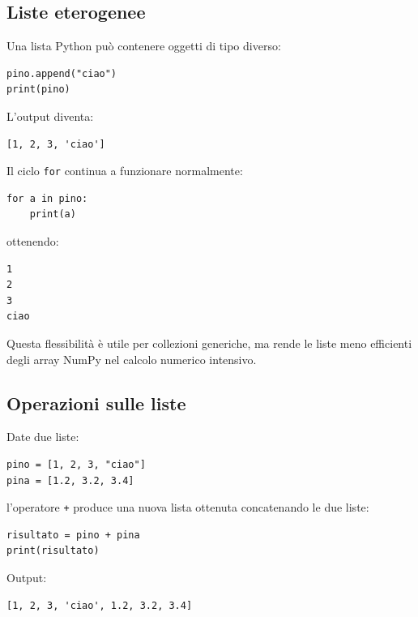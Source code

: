 \documentclass[11pt,a4paper]{book}
\begin{document}
\subsection{Liste eterogenee}

Una lista Python può contenere oggetti di tipo diverso:

\begin{lstlisting}[style=python]
pino.append("ciao")
print(pino)
\end{lstlisting}

L'output diventa:

\begin{lstlisting}[style=python, numbers=none]
[1, 2, 3, 'ciao']
\end{lstlisting}

Il ciclo \texttt{for} continua a funzionare normalmente:

\begin{lstlisting}[style=python]
for a in pino:
    print(a)
\end{lstlisting}

ottenendo:

\begin{lstlisting}[style=python, numbers=none]
1
2
3
ciao
\end{lstlisting}

Questa flessibilità è utile per collezioni generiche, ma rende le liste meno efficienti degli array NumPy nel calcolo numerico intensivo.

\subsection{Operazioni sulle liste}

Date due liste:

\begin{lstlisting}[style=python]
pino = [1, 2, 3, "ciao"]
pina = [1.2, 3.2, 3.4]
\end{lstlisting}

l'operatore \texttt{+} produce una nuova lista ottenuta concatenando le due liste:

\begin{lstlisting}[style=python]
risultato = pino + pina
print(risultato)
\end{lstlisting}

Output:

\begin{lstlisting}[style=python, numbers=none]
[1, 2, 3, 'ciao', 1.2, 3.2, 3.4]
\end{lstlisting}
\end{document}
